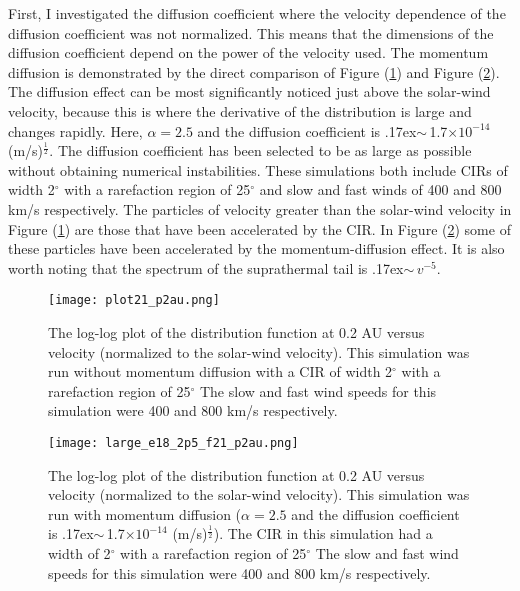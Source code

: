 \documentclass[%
 reprint,
 amsmath,amssymb,
 aps,
]{revtex4-1}
\begin{document}
First, I investigated the diffusion coefficient where the velocity dependence of the diffusion coefficient was not normalized. This means that the dimensions of the diffusion coefficient depend on the power of the velocity used. The momentum diffusion is demonstrated by the direct comparison of Figure (\ref{cirnomom}) and Figure (\ref{e182p5cir}). The diffusion effect can be most significantly noticed just above the solar-wind velocity, because this is where the derivative of the distribution is large and changes rapidly. Here, $\alpha = 2.5$ and the diffusion coefficient is \raise.17ex\hbox{$\scriptstyle\sim$}\,1.7$\times 10^{-14}$ (m/s)$^{\frac{1}{2}}$. The diffusion coefficient has been selected to be as large as possible without obtaining numerical instabilities. These simulations both include CIRs of width 2$^{\circ}$ with a rarefaction region of 25$^{\circ}$ and slow and fast winds of 400 and 800 km/s respectively. The particles of velocity greater than the solar-wind velocity in Figure (\ref{cirnomom}) are those that have been accelerated by the CIR. In Figure (\ref{e182p5cir}) some of these particles have been accelerated by the momentum-diffusion effect. It is also worth noting that the spectrum of the suprathermal tail is \raise.17ex\hbox{$\scriptstyle\sim$}\,$v^{-5}$.

\begin{figure}[h]
\texttt{[image: plot21\_p2au.png]}
\caption{The log-log plot of the distribution function at 0.2 AU versus velocity (normalized to the solar-wind velocity). This simulation was run without momentum diffusion with a CIR of width 2$^{\circ}$ with a rarefaction region of 25$^{\circ}$ The slow and fast wind speeds for this simulation were 400 and 800 km/s respectively.   \label{cirnomom}}
\end{figure}

\begin{figure}[h]
\texttt{[image: large\_e18\_2p5\_f21\_p2au.png]}
\caption{The log-log plot of the distribution function at 0.2 AU versus velocity (normalized to the solar-wind velocity). This simulation was run with momentum diffusion ($\alpha = 2.5$ and the diffusion coefficient is \raise.17ex\hbox{$\scriptstyle\sim$}\,1.7$\times 10^{-14}$ (m/s)$^{\frac{1}{2}}$). The CIR in this simulation had a width of 2$^{\circ}$ with a rarefaction region of 25$^{\circ}$ The slow and fast wind speeds for this simulation were 400 and 800 km/s respectively.  \label{e182p5cir} }
\end{figure}
\end{document}
